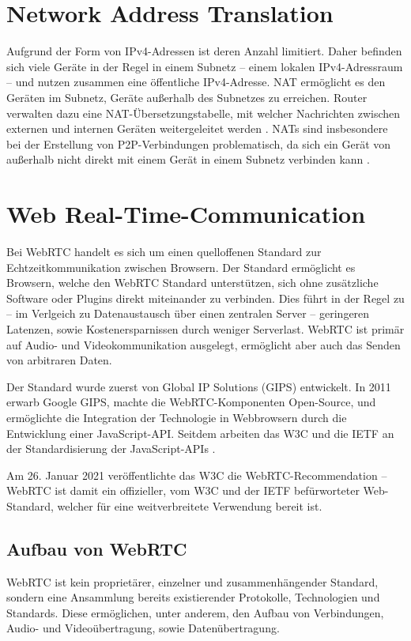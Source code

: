 \section{Network Address Translation}
Aufgrund der Form von \acs{IP}v4-Adressen ist deren Anzahl limitiert. Daher befinden sich viele Geräte in der Regel in einem Subnetz -- einem lokalen \acs{IP}v4-Adressraum -- und nutzen zusammen eine öffentliche \acs{IP}v4-Adresse. \acf{NAT} ermöglicht es den Geräten im Subnetz, Geräte außerhalb des Subnetzes zu erreichen. Router verwalten dazu eine \acs{NAT}-Übersetzungstabelle, mit welcher Nachrichten zwischen externen und internen Geräten weitergeleitet werden \cite{baun}. \acs{NAT}s sind insbesondere bei der Erstellung von \acs{P2P}-Verbindungen problematisch, da sich ein Gerät von außerhalb nicht direkt mit einem Gerät in einem Subnetz verbinden kann \cite{natproblemsRFC}.

\section{Web Real-Time-Communication}
Bei \ac{WebRTC} handelt es sich um einen quelloffenen Standard zur Echtzeitkommunikation zwischen Browsern. Der Standard ermöglicht es Browsern, welche den \acs{WebRTC} Standard unterstützen, sich ohne zusätzliche Software oder Plugins direkt miteinander zu verbinden. Dies führt in der Regel zu -- im Verlgeich zu Datenaustausch über einen zentralen Server -- geringeren Latenzen, sowie Kostenersparnissen durch weniger Serverlast. WebRTC ist primär auf Audio- und Videokommunikation ausgelegt, ermöglicht aber auch das Senden von arbitraren Daten.\par

Der Standard wurde zuerst von Global IP Solutions (GIPS) entwickelt. In 2011 erwarb Google GIPS, machte die \acs{WebRTC}-Komponenten Open-Source, und ermöglichte die Integration der Technologie in Webbrowsern durch die Entwicklung einer JavaScript-\acs{API}. Seitdem arbeiten das \acs{W3C} und die \acf{IETF} an der Standardisierung der JavaScript-\acs{API}s \cite{loreto2014}.

Am 26. Januar 2021 veröffentlichte das \acs{W3C} die \acs{WebRTC}-Recommendation -- \acs{WebRTC} ist damit ein offizieller, vom \acs{W3C} und der \acs{IETF} befürworteter Web-Standard, welcher für eine weitverbreitete Verwendung bereit ist. 

\subsection{Aufbau von WebRTC}
WebRTC ist kein proprietärer, einzelner und zusammenhängender Standard, sondern eine Ansammlung bereits existierender Protokolle, Technologien und Standards. Diese ermöglichen, unter anderem, den Aufbau von Verbindungen, Audio- und Videoübertragung, sowie Datenübertragung.\par


